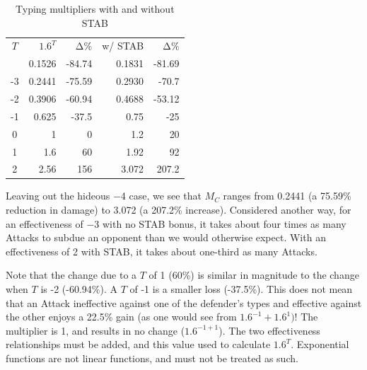 \begin{table}
\begin{center}
\begin{tabular}{c r r r r}
  $T$ & $1.6^{T}$ & Δ\% & w/ STAB & Δ\% \\
\Midrule
  -4 & 0.1526 & -84.74 & 0.1831 & -81.69 \\
  -3 & 0.2441 & -75.59 & 0.2930 & -70.7 \\
  -2 & 0.3906 & -60.94 & 0.4688 & -53.12 \\
  -1 & 0.625 & -37.5 & 0.75 & -25 \\
  0 & 1 & 0 & 1.2 & 20 \\
  1 & 1.6 & 60 & 1.92 & 92 \\
  2 & 2.56 & 156 & 3.072 & 207.2 \\
\end{tabular}
  \caption{Typing multipliers with and without STAB\label{table:typemult}}
\end{center}
\end{table}

Leaving out the hideous −4 case, we see that $M_C$ ranges
 from 0.2441 (a 75.59\% reduction in damage) to 3.072
 (a 207.2\% increase).
Considered another way, for an effectiveness of −3 with no STAB bonus,
 it takes about four times as many Attacks to subdue an opponent than
 we would otherwise expect.
With an effectiveness of 2 with STAB, it takes about one-third as many Attacks.

Note that the change due to a $T$ of 1 (60\%) is similar in magnitude to the change
 when $T$ is -2 (-60.94\%). A $T$ of -1 is a smaller loss (-37.5\%).
This does not mean that an Attack ineffective against one of the defender's types and
 effective against the other enjoys a 22.5\% gain (as one would see from $1.6^{-1} + 1.6^{1})$!
The multiplier is 1, and results in no change ($1.6^{-1+1}$).
The two effectiveness relationships must be added, and this value used to
 calculate $1.6^T$.
Exponential functions are not linear functions, and must not be treated as such.

